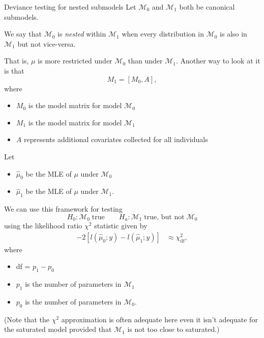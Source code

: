 \documentclass[
  ignorenonframetext,
]{beamer}
\providecommand{\tightlist}{%
  \setlength{\itemsep}{0pt}\setlength{\parskip}{0pt}}
\begin{document}
\begin{frame}{Deviance testing for nested submodels}
\protect\hypertarget{deviance-testing-for-nested-submodels}{}
Let \(\mathcal{M}_0\) and \(\mathcal{M}_1\) both be canonical submodels.

\vspace{12pt}

We say that \(\mathcal{M}_0\) is \emph{nested} within \(\mathcal{M}_1\)
when every distribution in \(\mathcal{M}_0\) is also in
\(\mathcal{M}_1\) but not vice-versa.

\vspace{12pt}

That is, \(\mu\) is more restricted under \(\mathcal{M}_0\) than under
\(\mathcal{M}_1\). Another way to look at it is that \[
  M_1 = \left[M_0, A \right],
\] where

\begin{itemize}
\tightlist
\item
  \(M_0\) is the model matrix for model \(\mathcal{M}_0\)
\item
  \(M_1\) is the model matrix for model \(\mathcal{M}_1\)
\item
  \(A\) represents additional covariates collected for all individuals
\end{itemize}
\end{frame}

\begin{frame}{}
\protect\hypertarget{section-11}{}
Let

\begin{itemize}
\tightlist
\item
  \(\hat\mu_0\) be the MLE of \(\mu\) under \(\mathcal{M}_0\)
\item
  \(\hat\mu_1\) be the MLE of \(\mu\) under \(\mathcal{M}_1\).
\end{itemize}

\vspace{12pt}

We can use this framework for testing \[
  H_0:\mathcal{M}_0 \; \text{true} \qquad H_a:\mathcal{M}_1 \; \text{true, but not} \; \mathcal{M}_0
\] using the likelihood ratio \(\chi^2\) statistic given by
\begin{align*}
 -2\left[l(\hat\mu_0;y) - l(\hat\mu_1;y)\right] %
   &\approx \chi^2_{\text{df}}, 
\end{align*} where

\begin{itemize}
\tightlist
\item
  df = \(p_1 - p_0\)
\item
  \(p_1\) is the number of parameters in \(\mathcal{M}_1\)
\item
  \(p_0\) is the number of parameters in \(\mathcal{M}_0\).
\end{itemize}

(Note that the \(\chi^2\) approximation is often adequate here even it
isn't adequate for the saturated model provided that \(\mathcal{M}_1\)
is not too close to saturated.)
\end{frame}
\end{document}
